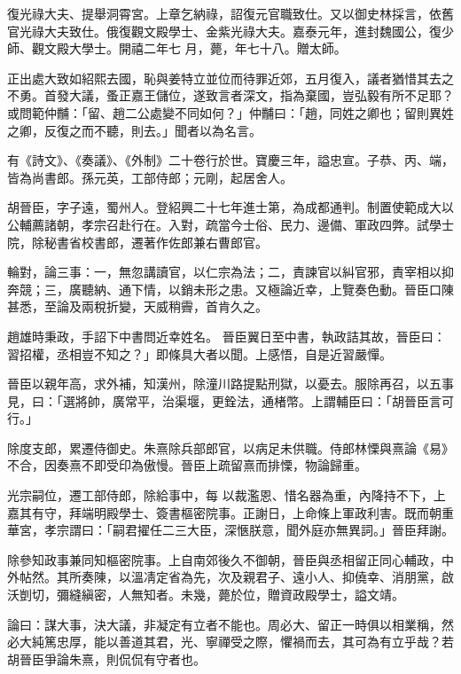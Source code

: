 \begin{pinyinscope}
 復光祿大夫、提舉洞霄宮。上章乞納祿，詔復元官職致仕。又以御史林採言，依舊官光祿大夫致仕。俄復觀文殿學士、金紫光祿大夫。嘉泰元年，進封魏國公，復少師、觀文殿大學士。開禧二年七
 月，薨，年七十八。贈太師。



 正出處大致如紹熙去國，恥與姜特立並位而待罪近郊，五月復入，議者猶惜其去之不勇。首發大議，蚤正嘉王儲位，遂致言者深文，指為棄國，豈弘毅有所不足耶？或問範仲黼：「留、趙二公處變不同如何？」仲黼曰：「趙，同姓之卿也；留則異姓之卿，反復之而不聽，則去。」聞者以為名言。



 有《詩文》、《奏議》、《外制》二十卷行於世。寶慶三年，謚忠宣。子恭、丙、端，皆為尚書郎。孫元英，工部侍郎；元剛，起居舍人。



 胡晉臣，字子遠，蜀州人。登紹興二十七年進士第，為成都通判。制置使範成大以公輔薦諸朝，孝宗召赴行在。入對，疏當今士俗、民力、邊備、軍政四弊。試學士院，除秘書省校書郎，遷著作佐郎兼右曹郎官。



 輪對，論三事：一，無忽講讀官，以仁宗為法；二，責諫官以糾官邪，責宰相以抑奔競；三，廣聽納、通下情，以銷未形之患。又極論近幸，上覽奏色動。晉臣口陳甚悉，至論及兩稅折變，天威稍霽，首肯久之。



 趙雄時秉政，手詔下中書問近幸姓名。
 晉臣翼日至中書，執政詰其故，晉臣曰：習招權，丞相豈不知之？」即條具大者以聞。上感悟，自是近習嚴憚。



 晉臣以親年高，求外補，知漢州，除潼川路提點刑獄，以憂去。服除再召，以五事見，曰：「選將帥，廣常平，治渠堰，更銓法，通楮幣。上謂輔臣曰：「胡晉臣言可行。」



 除度支郎，累遷侍御史。朱熹除兵部郎官，以病足未供職。侍郎林慄與熹論《易》不合，因奏熹不即受印為傲慢。晉臣上疏留熹而排慄，物論歸重。



 光宗嗣位，遷工部侍郎，除給事中，每
 以裁濫恩、惜名器為重，內降持不下，上嘉其有守，拜端明殿學士、簽書樞密院事。正謝日，上命條上軍政利害。既而朝重華宮，孝宗謂曰：「嗣君擢任二三大臣，深愜朕意，聞外庭亦無異詞。」晉臣拜謝。



 除參知政事兼同知樞密院事。上自南郊後久不御朝，晉臣與丞相留正同心輔政，中外帖然。其所奏陳，以溫凊定省為先，次及親君子、遠小人、抑僥幸、消朋黨，啟沃剴切，彌縫縝密，人無知者。未幾，薨於位，贈資政殿學士，謚文靖。



 論曰：謀大事，決大議，非凝定有立者不能也。周必大、留正一時俱以相業稱，然必大純篤忠厚，能以善道其君，光、寧禪受之際，懼禍而去，其可為有立乎哉？若胡晉臣爭論朱熹，則侃侃有守者也。



\end{pinyinscope}
